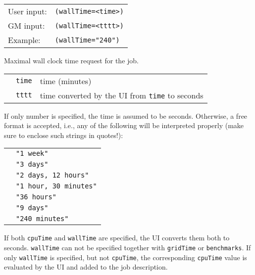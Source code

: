   \hspace*{0.5cm}
  \begin{shaded}
  \end{shaded}
  \begin{tabular}{lp{13cm}}
    User input:&\verb#(wallTime=<time>)#\\
    GM input:&\verb#(wallTime=<tttt>)#\\
    Example:&\verb#(wallTime="240")#\\
  \end{tabular}

  Maximal wall clock time request for the job. 

  \begin{tabular}{llp{10cm}}
    \hspace*{1cm}&\texttt{time} & time (minutes)\\
    \hspace*{1cm}&\texttt{tttt} & time converted by the UI from \texttt{time} to seconds\\
  \end{tabular}
  
  If only number is specified, the time is assumed to be
  seconds. Otherwise, a free format is accepted, i.e., any of the
  following will be interpreted properly (make sure to enclose such
  strings in quotes!):

  \begin{tabular}{ll}
    \hspace*{1cm}&\texttt{"1 week"}\\
    \hspace*{1cm}&\texttt{"3 days"}\\
    \hspace*{1cm}&\texttt{"2 days, 12 hours"}\\
    \hspace*{1cm}&\texttt{"1 hour, 30 minutes"}\\
    \hspace*{1cm}&\texttt{"36 hours"}\\
    \hspace*{1cm}&\texttt{"9 days"}\\
    \hspace*{1cm}&\texttt{"240 minutes"}\\
  \end{tabular}
 
  If both \texttt{cpuTime} and \texttt{wallTime} are specified, the UI converts them both to 
  seconds. \texttt{wallTime} can not be specified together with \texttt{gridTime}
  or \texttt{benchmarks}. If only \texttt{wallTime} is specified, but not \texttt{cpuTime},
  the corresponding  \texttt{cpuTime} value is evaluated by the UI and added to the job description.
 
